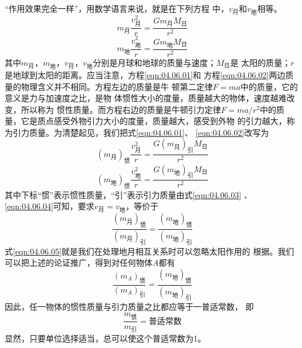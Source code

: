 “作用效果完全一样”，用数学语言来说，就是在下列方程
中，$ v_\text{月} $和$v_\text{地}$相等。
\begin{equation}\label{eqn:04.06.01}
	m _ { \text{月} } \frac { v _ { \text{月} } ^ { 2 } } { r } = \frac { G m _ { \text{月} } M _ { \text{日} } } { r ^ { 2 } }
\end{equation}
\begin{equation}\label{eqn:04.06.02}
	m _ { \text{地} } \frac { v _ { \text{地} } ^ { 2 } } { r } = \frac { G m _ { \text{地} } M _ { \text{日} } } { r ^ { 2 } }
\end{equation}
其中$ m _ { \text{月} } $，$ m _ { \text{地} } $，$ v _ { \text{月} } $，$ v _ { \text{地} } $分别是月球和地球的质量与速度；$ M _ { \text{日} } $是
太阳的质量；$ r $是地球到太阳的距离。应当注意，方程\eqref{eqn:04.06.01}和
方程\ref{eqn:04.06.02}两边质量的物理含义并不相同。方程左边的质量是牛
顿第二定律$  F = m a   $中的质量，它的意义是力与加速度之比，是物
体惯性大小的度量，质量越大的物体，速度越难改变，所以称为
惯性质量。而方程右边的质量是牛顿引力定律$  F = m a / r ^ { 2 }   $中的质
量，它是质点感受外物引力大小的度量，质量越大，感受到外物
的引力越大，称为引力质量。为清楚起见，我们把式\eqref{eqn:04.06.01}、
\eqref{eqn:04.06.02}改写为
\begin{equation}\label{eqn:04.06.03}
	(m _ { \text{月} }) _ {\text{惯}}
\frac { v _ { \text{月} } ^ 2 } { r } = \frac { G (m _ { \text{月} }) _ {\text{引}} M _ { \text{日} } } { r ^ { 2 } }
\end{equation}
\begin{equation}\label{eqn:04.06.04}
	(m _ { \text{地} }) _ {\text{惯}}
\frac { v _ { \text{地} } ^ 2 } { r } = \frac { G (m _ { \text{地} }) _ {\text{引}} M _ { \text{日} } } { r ^ { 2 } }
\end{equation}
其中下标“惯”表示惯性质量，“引”表示引力质量由式\ref{eqn:04.06.03}
、\ref{eqn:04.06.04}可知，要求$ v _ { \text{月}}=v _ { \text{地} } $，等价于
\begin{equation}\label{eqn:04.06.05}
	\frac { (m _ { \text{月} }) _ {\text{惯}} } { (m _ { \text{月} }) _ {\text{引}} } = \frac { (m _ { \text{地} }) _ {\text{惯}} } { (m _ { \text{地} }) _ {\text{引}} }
\end{equation}
式\eqref{eqn:04.06.05}就是我们在处理地月相互关系时可以忽略太阳作用的
根据。我们可以把上述的论证推广，得到对任何物体$ A $都有
\begin{equation}\label{eqn:04.06.06}
	\frac { (m _ { A }) _ {\text{惯}} } { (m _ { A }) _ {\text{引}} } = \frac { (m _ { \text{地} }) _ {\text{惯}} } { (m _ { \text{地} }) _ {\text{引}} }
\end{equation}
因此，任一物体的惯性质量与引力质量之比都应等于一普适常数，
即\vspace{-1.2em}
\begin{equation}\label{eqn:04.06.07}
	\frac { m _ {\text{惯}} } { m _ {\text{引}} } = \text{普适常数}
\end{equation}
显然，只要单位选择适当，总可以使这个普适常数为1。

